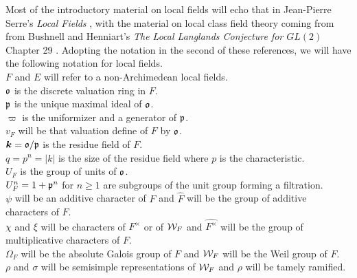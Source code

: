 Most of the introductory material on local fields will echo that in Jean-Pierre Serre's \textit{Local Fields} \cite{Serre1979}, with the material on local class field theory coming from from Bushnell and Henniart's \textit{The Local Langlands Conjecture for $GL(2)$} Chapter 29 \cite{Bushnell2006}.
Adopting the notation in the second of these references, we will have the following notation for local fields.\\
$F$ and $E$ will refer to a non-Archimedean local fields.\\
$\mathfrak{o}$ is the discrete valuation ring in $F$.\\
$\mathfrak{p}$ is the unique maximal ideal of $\mathfrak{o}$.\\
$\varpi$ is the uniformizer and a generator of $\mathfrak{p}$.\\
$v_F$ will be that valuation define of $F$ by $\mathfrak{o}$.\\
$\bm{k} = \mathfrak{o}/\mathfrak{p}$ is the residue field of $F$.\\
$q = p^n = |k|$ is the size of the residue field where $p$ is the characteristic.\\
$U_F$ is the group of units of $\mathfrak{o}$.\\
$U_F^n = 1 + \mathfrak{p}^n$ for $n \geq 1$ are subgroups of the unit group forming a filtration.\\
$\psi$ will be an additive character of $F$ and $\widehat{F}$ will be the group of additive characters of $F$. \\
$\chi$ and $\xi$ will be characters of $F^\times$ or of $\mathcal{W}_F$ and $\widehat{F^\times}$ will be the group of multiplicative characters of $F$. \\
$\Omega_F$ will be the absolute Galois group of $F$ and $\mathcal{W}_F$ will be the Weil group of $F$. \\
$\rho$ and $\sigma$ will be semisimple representations of $\mathcal{W}_F$ and $\rho$ will be tamely ramified.\\


